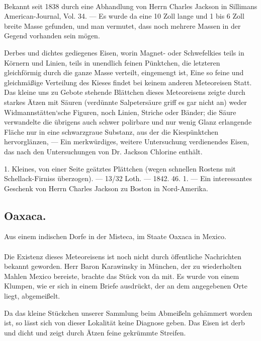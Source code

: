 \documentclass[a4paper, 11pt, oneside, polutonikogreek, german]{article}
\begin{document}
\paragraph{}
Bekannt seit 1838 durch eine Abhandlung von Herrn Charles Jackson in Sillimans American-Journal, Vol. 34. — Es wurde da eine 10 Zoll lange und 1 bis 6 Zoll breite Masse gefunden, und man vermutet, dass noch mehrere Massen in der Gegend vorhanden sein mögen.

Derbes und dichtes gediegenes Eisen, worin Magnet- oder Schwefelkies teils in Körnern und Linien, teils in unendlich feinen Pünktchen, die letzteren gleichförmig durch die ganze Masse verteilt, eingemengt ist, Eine so feine und gleichmäßige Verteilung des Kieses findet bei keinem anderen Meteoreisen Statt. Das kleine uns zu Gebote stehende Blättchen dieses Meteoreisens zeigte durch starkes Ätzen mit Säuren (verdünnte Salpetersäure griff es gar nicht an) weder Widmannstätten‘sche Figuren, noch Linien, Striche oder Bänder; die Säure verwandelte die übrigens auch schwer polirbare und nur wenig Glanz erlangende Fläche nur in eine schwarzgraue Substanz, aus der die Kiespünktchen hervorglänzen, — Ein merkwürdiges, weitere Untersuchung verdienendes Eisen, das nach den Untersuchungen von Dr. Jackson Chlorine enthält.

1. Kleines, von einer Seite geätztes Plättchen (wegen schnellen Rostens mit Schellack-Firniss überzogen). — 13/32 Loth. — 1842. 46. 1. — Ein interessantes Geschenk von Herrn Charles Jackson zu Boston in Nord-Amerika.
\subsection{Oaxaca.}
\begin{center}
\small
Aus einem indischen Dorfe in der Misteca, im Staate Oaxaca in Mexico.
\end{center}
\paragraph{}
Die Existenz dieses Meteoreisens ist noch nicht durch öffentliche Nachrichten bekannt geworden. Herr Baron Karawinsky in München, der zu wiederholten Mahlen Mexico bereiste, brachte das Stück von da mit. Es wurde von einem Klumpen, wie er sich in einem Briefe ausdrückt, der an dem angegebenen Orte liegt, abgemeißelt.

Da das kleine Stückchen unserer Sammlung beim Abmeißeln gehämmert worden ist, so lässt sich von dieser Lokalität keine Diagnose geben. Das Eisen ist derb und dicht und zeigt durch Ätzen feine gekrümmte Streifen.
\end{document}

